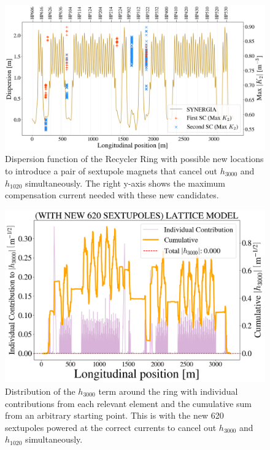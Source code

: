 \begin{figure}[H]
    \centering
    \includegraphics[width=\columnwidth]{chapter4/new_sexts_dx.png}
    \caption{Dispersion function of the Recycler Ring with possible new locations to introduce a pair of sextupole magnets that cancel out $h_{3000}$ and $h_{1020}$ simultaneously. The right y-axis shows the maximum compensation current needed with these new candidates.}
    \label{fig:dxnewsexts}
\end{figure}

\begin{figure}[H]
    \centering
    \includegraphics[width=\columnwidth]{chapter4/new_sexts_h3000.png}
    \caption{Distribution of the $h_{3000}$ term around the ring with individual contributions from each relevant element and the cumulative sum from an arbitrary starting point. This is with the new 620 sextupoles powered at the correct currents to cancel out $h_{3000}$ and $h_{1020}$ simultaneously.}
    \label{fig:h3000newsexts}
\end{figure}


